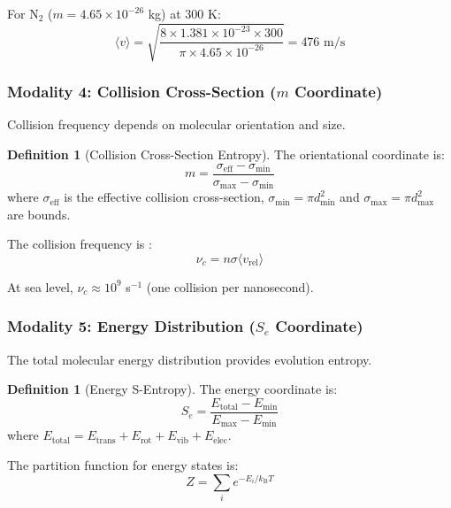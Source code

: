 \documentclass[twocolumn,10pt,a4paper]{article}
\theoremstyle{definition}
\newtheorem{definition}[theorem]{Definition}
\theoremstyle{remark}
\newcommand{\kB}{k_{\mathrm{B}}}
\begin{document}
For N$_2$ ($m = 4.65 \times 10^{-26}$ kg) at 300 K:
\begin{equation}
    \langle v \rangle = \sqrt{\frac{8 \times 1.381 \times 10^{-23} \times 300}{\pi \times 4.65 \times 10^{-26}}} = 476 \text{ m/s}
\end{equation}

\subsubsection{Modality 4: Collision Cross-Section ($m$ Coordinate)}

Collision frequency depends on molecular orientation and size.

\begin{definition}[Collision Cross-Section Entropy]
\label{def:collision_entropy}
The orientational coordinate is:
\begin{equation}
    m = \frac{\sigma_{\text{eff}} - \sigma_{\min}}{\sigma_{\max} - \sigma_{\min}}
\end{equation}
where $\sigma_{\text{eff}}$ is the effective collision cross-section, $\sigma_{\min} = \pi d_{\min}^2$ and $\sigma_{\max} = \pi d_{\max}^2$ are bounds.
\end{definition}

The collision frequency is \cite{kinetic1954chapman}:
\begin{equation}
    \nu_c = n \sigma \langle v_{\text{rel}} \rangle
\end{equation}

At sea level, $\nu_c \approx 10^9$ s$^{-1}$ (one collision per nanosecond).

\subsubsection{Modality 5: Energy Distribution ($S_e$ Coordinate)}

The total molecular energy distribution provides evolution entropy.

\begin{definition}[Energy S-Entropy]
\label{def:energy_entropy}
The energy coordinate is:
\begin{equation}
    S_e = \frac{E_{\text{total}} - E_{\min}}{E_{\max} - E_{\min}}
\end{equation}
where $E_{\text{total}} = E_{\text{trans}} + E_{\text{rot}} + E_{\text{vib}} + E_{\text{elec}}$.
\end{definition}

The partition function for energy states is:
\begin{equation}
    Z = \sum_{i} e^{-E_i/\kB T}
\end{equation}
\end{document}
